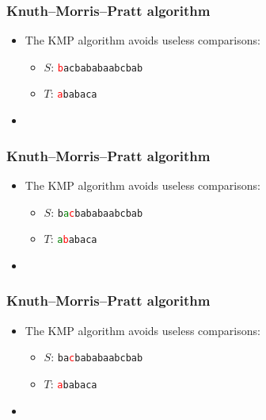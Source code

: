 \begin{frame}
    \frametitle{Knuth--Morris--Pratt algorithm}
    \begin{itemize}
    \item The KMP algorithm avoids useless comparisons:
        \begin{itemize}
            \item $S$: \texttt{\textcolor{red}{b}acbababaabcbab}
            \item $T$: \phantom{\texttt{}}\texttt{\textcolor{red}{a}babaca}
        \end{itemize}
    \item[] \phantom{The number of shifts depend on which characters are currently matched}
    \end{itemize}
\end{frame}
\begin{frame}
    \frametitle{Knuth--Morris--Pratt algorithm}
    \begin{itemize}
    \item The KMP algorithm avoids useless comparisons:
        \begin{itemize}
            \item $S$: \texttt{b\textcolor{green}{a}\textcolor{red}{c}bababaabcbab}
            \item $T$: \texttt{\textcolor{green}{a}\textcolor{red}{b}abaca}
        \end{itemize}
    \item[] \phantom{The number of shifts depend on which characters are currently matched}
    \end{itemize}
\end{frame}
\begin{frame}
    \frametitle{Knuth--Morris--Pratt algorithm}
    \begin{itemize}
    \item The KMP algorithm avoids useless comparisons:
        \begin{itemize}
            \item $S$: \texttt{ba\textcolor{red}{c}bababaabcbab}
            \item $T$: \texttt{\textcolor{red}{a}babaca}
        \end{itemize}
    \item[] \phantom{The number of shifts depend on which characters are currently matched}
    \end{itemize}
\end{frame}
